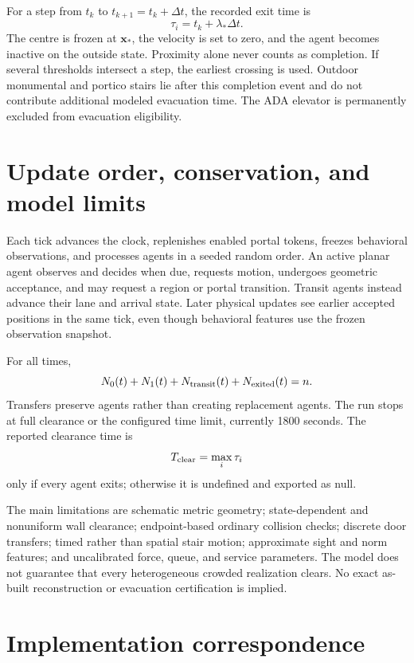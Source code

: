 \documentclass[11pt]{article}
\begin{document}
For a step from $t_k$ to $t_{k+1}=t_k+\Delta t$, the recorded exit time is
\[
 \tau_i=t_k+\lambda_*\Delta t.
\]
The centre is frozen at $\mathbf x_*$, the velocity is set to zero, and the
agent becomes inactive on the outside state. Proximity alone never counts as
completion. If several thresholds intersect a step, the earliest crossing is
used. Outdoor monumental and portico stairs lie after this completion event
and do not contribute additional modeled evacuation time. The ADA elevator
is permanently excluded from evacuation eligibility.

\section{Update order, conservation, and model limits}

Each tick advances the clock, replenishes enabled portal tokens, freezes
behavioral observations, and processes agents in a seeded random order.
An active planar agent observes and decides when due, requests motion,
undergoes geometric acceptance, and may request a region or portal transition.
Transit agents instead advance their lane and arrival state. Later physical
updates see earlier accepted positions in the same tick, even though behavioral
features use the frozen observation snapshot.

For all times,
\[
 N_0(t)+N_1(t)+N_{\rm transit}(t)+N_{\rm exited}(t)=n.
\]
Transfers preserve agents rather than creating replacement agents. The run
stops at full clearance or the configured time limit, currently 1800 seconds.
The reported clearance time is
\[
 T_{\rm clear}=\max_i\tau_i
\]
only if every agent exits; otherwise it is undefined and exported as null.

The main limitations are schematic metric geometry; state-dependent and
nonuniform wall clearance; endpoint-based ordinary collision checks; discrete
door transfers; timed rather than spatial stair motion; approximate sight and
norm features; and uncalibrated force, queue, and service parameters. The
model does not guarantee that every heterogeneous crowded realization clears.
No exact as-built reconstruction or evacuation certification is implied.

\section{Implementation correspondence}
\end{document}
